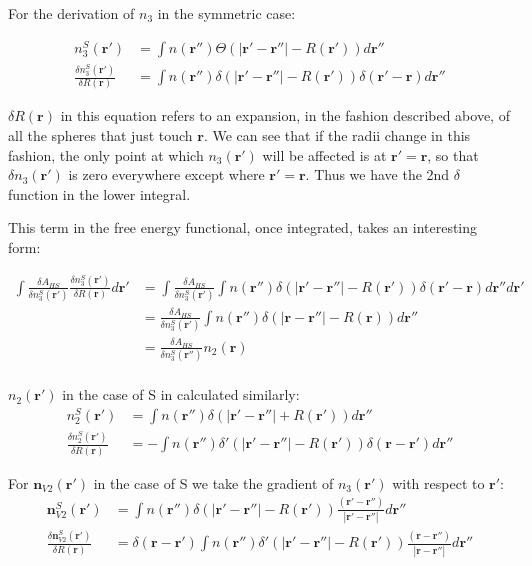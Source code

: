 \documentclass[letterpaper,twocolumn,amsmath,amssymb,jcp,10pt,aip]{revtex4-1}
\begin{document}
{  For the derivation of $n_{3}$ in the symmetric case:

\begin{align}  
  n_3^{S}(\mathbf{r}') &= \int n(\mathbf{r}'') \Theta(\left|\mathbf{r}' - \mathbf{r}''\right| -R(\mathbf{r}')) d\mathbf{r}''\\
  \frac{\delta n_3^{S} (\mathbf{r}')}{\delta R(\mathbf{r})} &=
  \int n (\mathbf{r}'') \delta(|\mathbf{r}' - \mathbf{r}''| - R(\mathbf{r}')) \delta(\mathbf{r}'-\mathbf{r}) d\mathbf{r}''
\end{align}
  
  $\delta R(\mathbf{r})$ in this equation refers to an expansion, in the fashion described above, of all the spheres that just touch $\mathbf{r}$.  We can see that if the radii change in this fashion, the only point at which $n_3(\mathbf{r}')$ will be affected is at $\mathbf{r}' = \mathbf{r}$, so that $\delta n_3(\mathbf{r}')$ is zero everywhere except where $\mathbf{r}' = \mathbf{r}$.  Thus we have the 2nd $\delta$ function in the lower integral.

This term in the free energy functional, once integrated, takes an interesting form:  

\begin{align}
  \int \frac{\delta A_{HS}}{\delta n_3^{S}(\mathbf{r}')} 
  \frac{\delta n_3^{S}(\mathbf{r}')}{\delta R(\mathbf{r})} d\mathbf{r}' 
  &= \int \frac{\delta A_{HS}}{\delta n_3^{S}(\mathbf{r}')} \int n (\mathbf{r}'') \delta(|\mathbf{r}' - \mathbf{r}''| - R(\mathbf{r}')) \delta(\mathbf{r}'-\mathbf{r}) d\mathbf{r}'' d\mathbf{r}' \\
  &= \frac{\delta A_{HS}}{\delta n_3^{S}(\mathbf{r}')} \int n (\mathbf{r}'') \delta(|\mathbf{r} - \mathbf{r}''| - R(\mathbf{r})) d\mathbf{r}''\\
  &= \frac{\delta A_{HS}}{\delta n_3^{S}(\mathbf{r}'')} n_2(\mathbf{r})\\
\end{align}
  
 $n_2(\mathbf{r}')$ in the case of S in calculated similarly:
\begin{align}
  n_2^{S}(\mathbf{r}') &= \int n(\mathbf{r}'') \delta(|\mathbf{r}' - \mathbf{r}''| + R(\mathbf{r}'))d\mathbf r''\\
    \frac{\delta n_2^{S}(\mathbf{r}')}{\delta R(\mathbf{r})} &= -\int n(\mathbf{r}'') 
  \delta'(|\mathbf{r}'-\mathbf{r}''| - R(\mathbf{r}')) \delta(\mathbf{r}-\mathbf{r}') d\mathbf{r}''
\end{align}

For $\mathbf{n}_{V2}(\mathbf{r}')$ in the case of S we take the gradient of $n_3(\mathbf{r}')$ with respect to $\mathbf{r}'$: 
\begin{align}
  \mathbf{n}_{V2}^{S}(\mathbf{r}') &= \int n(\mathbf{r}'') \delta(|\mathbf{r}' - \mathbf{r}''| - R(\mathbf{r}'))
  \frac{(\mathbf{r}' - \mathbf{r}'')}{|\mathbf{r}' - \mathbf{r}''|} d \mathbf{r}''\\
  \frac{\delta \mathbf{n}_{V2}^{S}(\mathbf{r}')}{\delta R(\mathbf{r})} &= \delta(\mathbf{r} - \mathbf{r}')
  \int n(\mathbf{r}'') \delta'(|\mathbf{r}' - \mathbf{r}''| - R(\mathbf{r}')) 
  \frac{(\mathbf{r} - \mathbf{r}'')}{|\mathbf{r} - \mathbf{r}''|} d\mathbf{r}''
\end{align}

}
\end{document}
